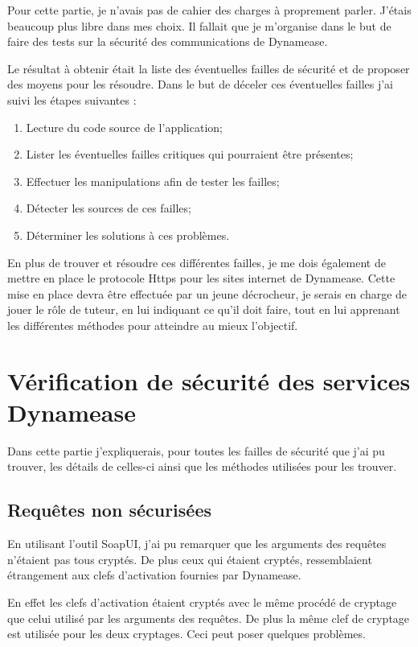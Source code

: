 Pour cette partie, je n'avais pas de cahier des charges à proprement parler. J'étais beaucoup plus libre dans mes choix. Il fallait que je m'organise dans le but de faire des tests sur la sécurité des communications de Dynamease. 

Le résultat à obtenir était la liste des éventuelles failles de sécurité et de proposer des moyens pour les résoudre. Dans le but de déceler ces éventuelles failles j'ai suivi les étapes suivantes :

\begin{enumerate}
	\item Lecture du code source de l'application;
	\item Lister les éventuelles failles critiques qui pourraient être présentes;
	\item Effectuer les manipulations afin de tester les failles;
	\item Détecter les sources de ces failles;
	\item Déterminer les solutions à ces problèmes.
\end{enumerate} 

En plus de trouver et résoudre ces différentes failles, je me dois également de mettre en place le protocole Https pour les sites internet de Dynamease. Cette mise en place devra être effectuée par un jeune décrocheur, je serais en charge de jouer le rôle de tuteur, en lui indiquant ce qu'il doit faire, tout en lui apprenant les différentes méthodes pour atteindre au mieux l'objectif.

\section{Vérification de sécurité des services Dynamease}

Dans cette partie j'expliquerais, pour toutes les failles de sécurité que j'ai pu trouver, les détails de celles-ci ainsi que les méthodes utilisées pour les trouver.

\subsection{Requêtes non sécurisées}

En utilisant l'outil SoapUI, j'ai pu remarquer que les arguments des requêtes n'étaient pas tous cryptés. De plus ceux qui étaient cryptés, ressemblaient étrangement aux clefs d'activation fournies par Dynamease.

En effet les clefs d'activation étaient cryptés avec le même procédé de cryptage que celui utilisé par les arguments des requêtes. De plus la même clef de cryptage est utilisée pour les deux cryptages. Ceci peut poser quelques problèmes.

